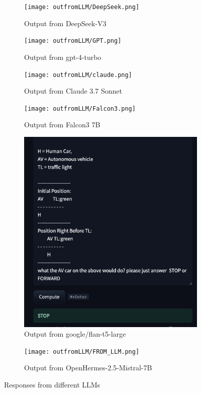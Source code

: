 \documentclass[conference]{IEEEtran}
\begin{document}
\begin{figure}[h]
    \centering
    \begin{subfigure}[b]{0.48\textwidth}
        \texttt{[image: outfromLLM/DeepSeek.png]}
        \caption{Output from DeepSeek-V3}
    \end{subfigure}
    \hfill
    \begin{subfigure}[b]{0.48\textwidth}
        \texttt{[image: outfromLLM/GPT.png]}
        \caption{Output from gpt-4-turbo}
    \end{subfigure}
    
    \vspace{1em}
    \begin{subfigure}[b]{0.48\textwidth}
        \texttt{[image: outfromLLM/claude.png]}
        \caption{Output from Claude 3.7 Sonnet}
    \end{subfigure}
    \hfill
    \begin{subfigure}[b]{0.48\textwidth}
        \texttt{[image: outfromLLM/Falcon3.png]}
        \caption{Output from Falcon3 7B}
    \end{subfigure}
    \vspace{1em}
    \begin{subfigure}[b]{0.48\textwidth}
        \includegraphics[width=\linewidth]{outfromLLM/google:flan-t5-large.png}
        \caption{Output from google/flan-t5-large}
    \end{subfigure}
    \hfill
    \begin{subfigure}[b]{0.48\textwidth}
        \texttt{[image: outfromLLM/FROM\_LLM.png]}
        \caption{Output from OpenHermes-2.5-Mistral-7B}
    \end{subfigure}

    \caption{Responses from different LLMs}
    \label{fig:llm_outputs}
\end{figure}






\end{document}
